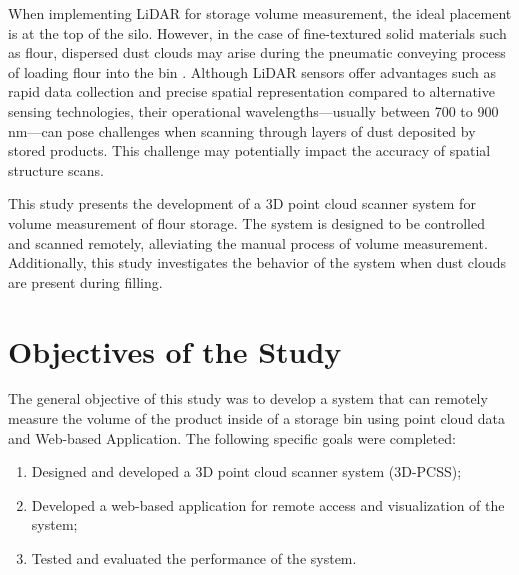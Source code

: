 When implementing LiDAR for storage volume measurement, the ideal placement is at the top of the silo. However, in the case of fine-textured solid materials such as flour, dispersed dust clouds may arise during the pneumatic conveying process of loading flour into the bin \citep{williams2007}. Although LiDAR sensors offer advantages such as rapid data collection and precise spatial representation compared to alternative sensing technologies, their operational wavelengths—usually between 700 to 900 nm—can pose challenges when scanning through layers of dust deposited by stored products. This challenge may potentially impact the accuracy of spatial structure scans.

This study presents the development of a 3D point cloud scanner system for volume measurement of flour storage. The system is designed to be controlled and scanned remotely, alleviating the manual process of volume measurement. Additionally, this study investigates the behavior of the system when dust clouds are present during filling.


\section{Objectives of the Study}
\label{intro:sec:Objectives of the Study}
The general objective of this study was to develop a system that can remotely measure the volume of the product inside of a storage bin using point cloud data and Web-based Application. The following specific goals were completed:

\begin{enumerate}
	\item Designed and developed a 3D point cloud scanner system (3D-PCSS);
	\item Developed a web-based application for remote access and visualization of the system;
	\item Tested and evaluated the performance of the system.
\end{enumerate}

